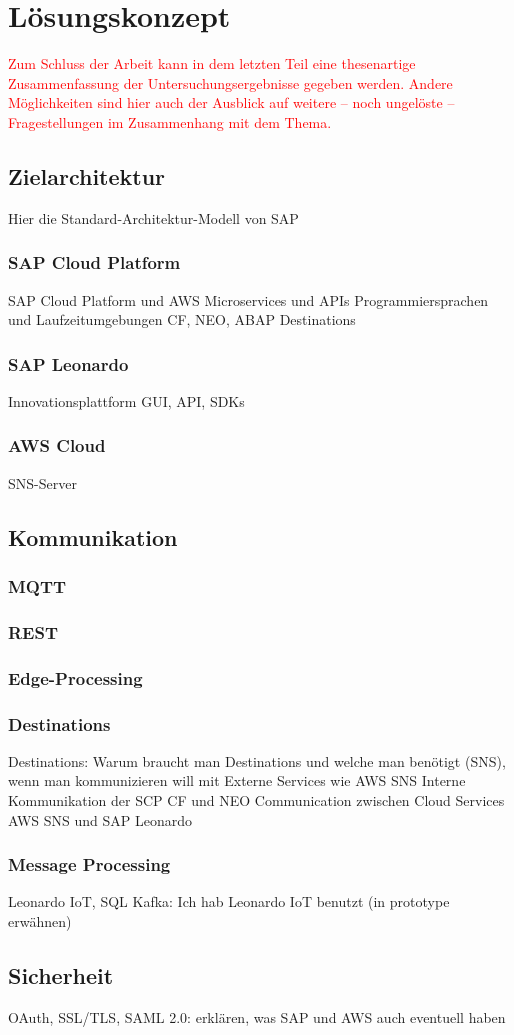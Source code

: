 \section{Lösungskonzept}
\textcolor{red}{Zum Schluss der Arbeit kann in dem letzten Teil eine thesenartige Zusammenfassung der Untersuchungsergebnisse gegeben werden. Andere Möglichkeiten sind hier auch der Ausblick auf weitere – noch ungelöste – Fragestellungen im Zusammenhang mit dem Thema.}

\subsection{Zielarchitektur}
Hier die Standard-Architektur-Modell von SAP

\subsubsection{SAP Cloud Platform}

SAP Cloud Platform und AWS Microservices und APIs
Programmiersprachen und Laufzeitumgebungen
CF, NEO, ABAP
Destinations

\subsubsection{SAP Leonardo}
Innovationsplattform
GUI, API, SDKs
\subsubsection{AWS Cloud}
SNS-Server

\subsection{Kommunikation}

\subsubsection{MQTT}

\subsubsection{REST}

\subsubsection{Edge-Processing}

\subsubsection{Destinations}
Destinations: Warum braucht man Destinations und welche man benötigt (SNS),  wenn man kommunizieren will mit
Externe Services wie AWS SNS
Interne Kommunikation der SCP CF und NEO
Communication zwischen Cloud Services AWS SNS und SAP Leonardo

\subsubsection{Message Processing}
Leonardo IoT, SQL Kafka: Ich hab Leonardo IoT benutzt (in prototype erwähnen)

\subsection{Sicherheit}
OAuth, SSL/TLS, SAML 2.0: erklären, was SAP und AWS auch eventuell haben

